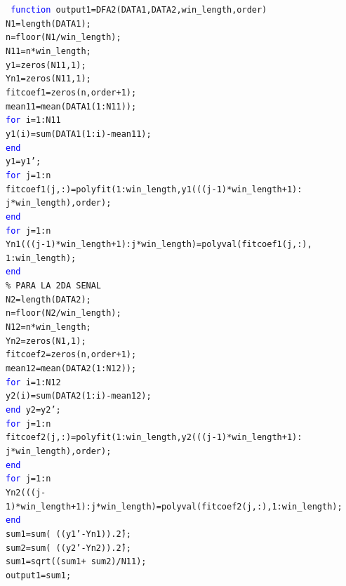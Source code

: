 \documentclass[letterpaper,titlepage,12pt,draft]{report}
\begin{document}
{\tt \setlength{\parindent}{0pt} \textcolor{blue}{function} output1=DFA2(DATA1,DATA2,win\_length,order)\\   
N1=length(DATA1);\\
n=floor(N1/win\_length);\\
N11=n*win\_length;\\
y1=zeros(N11,1);\\
Yn1=zeros(N11,1);\\     
fitcoef1=zeros(n,order+1);\\
mean11=mean(DATA1(1:N11));\\
\textcolor{blue}{for} i=1:N11\\
y1(i)=sum(DATA1(1:i)-mean11);\\
\textcolor{blue}{end}\\
y1=y1';\\
\textcolor{blue}{for} j=1:n\\
fitcoef1(j,:)=polyfit(1:win\_length,y1(((j-1)*win\_length+1):\\
j*win\_length),order);\\
\textcolor{blue}{end}\\
\textcolor{blue}{for} j=1:n\\
Yn1(((j-1)*win\_length+1):j*win\_length)=polyval(fitcoef1(j,:),\\
1:win\_length);\\
\textcolor{blue}{end}\\
\textcolor[cmyk]{1,0,1,0}{\% PARA LA 2DA SENAL}\\
N2=length(DATA2);\\
n=floor(N2/win\_length);\\
N12=n*win\_length;\\
Yn2=zeros(N1,1);\\      
fitcoef2=zeros(n,order+1);\\
mean12=mean(DATA2(1:N12));\\
\textcolor{blue}{for} i=1:N12\\
y2(i)=sum(DATA2(1:i)-mean12);\\
\textcolor{blue}{end}
y2=y2';\\
\textcolor{blue}{for} j=1:n\\
fitcoef2(j,:)=polyfit(1:win\_length,y2(((j-1)*win\_length+1):\\
j*win\_length),order);\\
\textcolor{blue}{end}\\
\textcolor{blue}{for} j=1:n\\
Yn2(((j-1)*win\_length+1):j*win\_length)=polyval(fitcoef2(j,:),1:win\_length);\\
\textcolor{blue}{end}\\
sum1=sum( ((y1'-Yn1)).\^2);\\%
sum2=sum( ((y2'-Yn2)).\^2);\\%
sum1=sqrt((sum1+ sum2)/N11);\\
output1=sum1;\\
}
\end{document}
